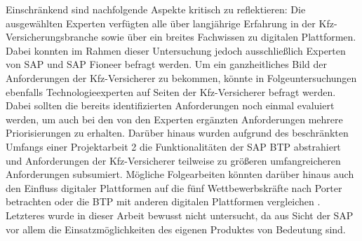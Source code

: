 Einschränkend sind nachfolgende Aspekte kritisch zu reflektieren: Die ausgewählten Experten verfügten alle über langjährige Erfahrung in der Kfz-Versicherungsbranche sowie über ein breites Fachwissen zu digitalen Plattformen. Dabei konnten im Rahmen dieser Untersuchung jedoch ausschließlich Experten von SAP und SAP Fioneer befragt werden. Um ein ganzheitliches Bild der Anforderungen der Kfz-Versicherer zu bekommen, könnte in Folgeuntersuchungen ebenfalls Technologieexperten auf Seiten der Kfz-Versicherer befragt werden. Dabei sollten die bereits identifizierten Anforderungen noch einmal evaluiert werden, um auch bei den von den Experten ergänzten Anforderungen mehrere Priorisierungen zu erhalten. Darüber hinaus wurden aufgrund des beschränkten Umfangs einer Projektarbeit 2 die Funktionalitäten der SAP BTP abstrahiert und Anforderungen der Kfz-Versicherer teilweise zu größeren umfangreicheren Anforderungen subsumiert. Mögliche Folgearbeiten könnten darüber hinaus auch den Einfluss digitaler Plattformen auf die fünf Wettbewerbskräfte nach Porter betrachten oder die BTP mit anderen digitalen Plattformen vergleichen . Letzteres wurde in dieser Arbeit bewusst nicht untersucht, da aus Sicht der SAP vor allem die Einsatzmöglichkeiten des eigenen Produktes von Bedeutung sind.


